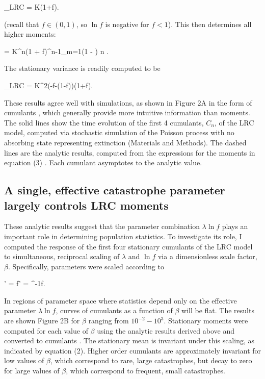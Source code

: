 \be
\expec[ X]_{LRC} = K\left(1+\ln f\right).
\ee

\noindent (recall that $f \in (0,1)$, so $\ln f$ is negative for $ f < 1$).  This then determines all higher moments:

\be
\expec[X^n] = K^{n}\left(1 + \ln f\right)\prod^{n-1}_{m=1}\left(1 - \right) \text{,\hspace{1cm}} n .
\ee

\noindent The stationary variance is readily computed to be

\be
 \Var[X]_{LRC} = K^2\left(-\ln f-(1-f)\right)\left(1+\ln f\right).
\ee
  
These results agree well with simulations, as shown in Figure 2A in the form of cumulants \cite{broca2004cumulant}, which generally provide more intuitive information than moments.  The solid lines show the time evolution of the first 4 cumulants, $C_n$, of the LRC model, computed via stochastic simulation of the Poisson process with no absorbing state representing extinction (Materials and Methods).  The dashed lines are the analytic results, computed from the expressions for the moments in equation (3)  \cite{broca2004cumulant}.  Each cumulant asymptotes to the analytic value.


\subsection{A single, effective catastrophe parameter largely controls LRC moments}

These analytic results suggest that the parameter combination $\lambda\ln f$ plays an important role in determining population statistics.  To investigate its role, I computed the response of the first four stationary cumulants of the LRC model to simultaneous, reciprocal scaling of $\lambda$ and $\ln f$ via a dimensionless scale factor, $\beta$.  Specifically, parameters were scaled according to

\be
\lambda' = \beta\lambda \text{,\hspace{1cm}} \ln f' = \beta^{-1}\ln f.
\ee

In regions of parameter space where statistics depend only on the effective parameter $\lambda\ln f$, curves of cumulants as a function of $\beta$ will be flat.  The results are shown Figure 2B for $\beta$ ranging from $10^{-2}-10^3$.  Stationary moments were computed for each value of $\beta$ using the analytic results derived above and converted to cumulants \cite{broca2004cumulant}.  The stationary mean is invariant under this scaling, as indicated by equation (2).  Higher order cumulants are approximately invariant for low values of $\beta$, which correspond to rare, large catastrophes, but decay to zero for large values of $\beta$, which correspond to frequent, small catastrophes.  

